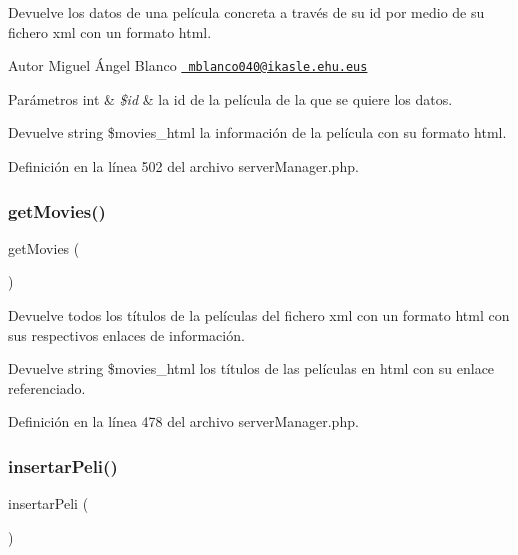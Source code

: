 Devuelve los datos de una película concreta a través de su id por medio de su fichero xml con un formato html.

\begin{DoxyAuthor}{Autor}
Miguel Ángel Blanco \href{mailto:mblanco040@ikasle.ehu.eus}{\texttt{ mblanco040@ikasle.\+ehu.\+eus}}
\end{DoxyAuthor}

\begin{DoxyParams}[1]{Parámetros}
int & {\em \$id} & la id de la película de la que se quiere los datos.\\
\hline
\end{DoxyParams}
\begin{DoxyReturn}{Devuelve}
string \$movies\+\_\+html la información de la película con su formato html. 
\end{DoxyReturn}


Definición en la línea 502 del archivo server\+Manager.\+php.

\mbox{\label{server_manager_8php_af16c238f2a71b7a08ff95871ae64c825}} 
\subsubsection{\texorpdfstring{getMovies()}{getMovies()}}
{\footnotesize\ttfamily get\+Movies (\begin{DoxyParamCaption}{ }\end{DoxyParamCaption})}

Devuelve todos los títulos de la películas del fichero xml con un formato html con sus respectivos enlaces de información.

\begin{DoxyReturn}{Devuelve}
string \$movies\+\_\+html los títulos de las películas en html con su enlace referenciado. 
\end{DoxyReturn}


Definición en la línea 478 del archivo server\+Manager.\+php.

\mbox{\label{server_manager_8php_aea99533bc26bc9f13ff095ef792636ea}} 
\subsubsection{\texorpdfstring{insertarPeli()}{insertarPeli()}}
{\footnotesize\ttfamily insertar\+Peli (\begin{DoxyParamCaption}{ }\end{DoxyParamCaption})}

